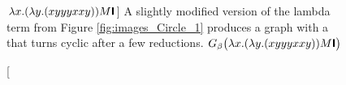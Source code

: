 \begin{figure}[htbp]
{	}
	\caption
	[$\lambda x.(\lambda y.(x y y y x x y)) M \textsf{\textbf{I}}$]
	{A slightly modified version of the lambda term from Figure \ref{fig:images_Circle_1}
	produces a graph with a that turns cyclic after a few reductions. 
	$G_\beta\big(\lambda x.(\lambda y.(x y y y x x y)) M \textsf{\textbf{I}}\big)$}
	\label{fig:images_Circle_2}
\end{figure}

